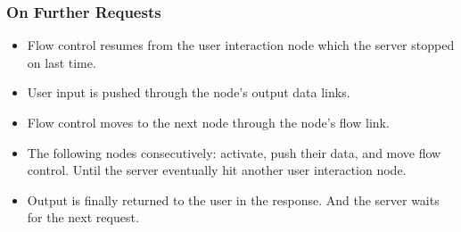\subsubsection{On Further Requests}
\begin{itemize}
    \item Flow control resumes from the user interaction node which the server stopped on last time.
    \item User input is pushed through the node's output data links.
    \item Flow control moves to the next node through the node's flow link.
    \item The following nodes consecutively: activate, push their data, and move flow control. Until the server eventually hit another user interaction node.
    \item Output is finally returned to the user in the response. And the server waits for the next request.
\end{itemize} 
